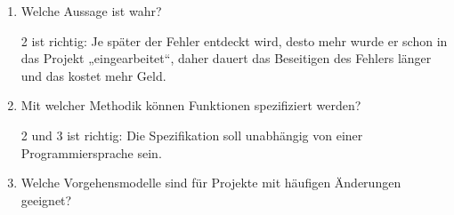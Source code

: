 \documentclass{lehramt-informatik-aufgabe}
\begin{document}
\begin{enumerate}


\item Welche Aussage ist wahr?


\begin{antwort}
2 ist richtig: Je später der Fehler entdeckt wird, desto mehr wurde er
schon in das Projekt „eingearbeitet“, daher dauert das Beseitigen des
Fehlers länger und das kostet mehr Geld.
\end{antwort}


\item  Mit welcher Methodik können Funktionen spezifiziert werden?


\begin{antwort}
2 und 3 ist richtig: Die Spezifikation soll unabhängig von einer
Programmiersprache sein.
\end{antwort}


\item Welche Vorgehensmodelle sind für Projekte mit häufigen Änderungen
geeignet?



\end{enumerate}
\end{document}
